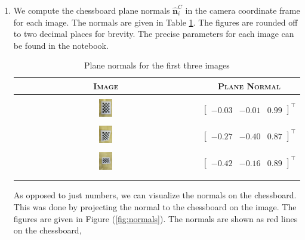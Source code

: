\documentclass[10pt]{article}
\newcommand{\figref}[1]{Figure (\ref{fig:#1})}
\begin{document}
\begin{enumerate}
        \item We compute the chessboard plane normals $\mathbf{\hat{n}}_{i}^{C}$ in the
        camera coordinate frame for each image. The normals are given in Table
        \ref{tab:plane-normals}. The figures are rounded off to two decimal places for
        brevity. The precise parameters for each image can be found in the notebook.
        \begin{longtable}{c|c}
            \textsc{Image} & \textsc{Plane Normal} \\
            \hline & \\
            \includegraphics[width=0.075\textwidth, valign=c]{Assets/Camera-Calibration/01.jpg}
            & $\begin{bmatrix} -0.03 & -0.01 & 0.99 \end{bmatrix}^{\top}$ \\
            & \\
            \includegraphics[width=0.075\textwidth, valign=c]{Assets/Camera-Calibration/02.jpg}
            & $\begin{bmatrix} -0.27 & -0.40 & 0.87 \end{bmatrix}^{\top}$ \\
            & \\
            \includegraphics[width=0.075\textwidth, valign=c]{Assets/Camera-Calibration/03.jpg}
            & $\begin{bmatrix} -0.42 & -0.16 & 0.89 \end{bmatrix}^{\top}$ \\
            & \\
            \caption{Plane normals for the first three images}
            \label{tab:plane-normals}
        \end{longtable}
        As opposed to just numbers, we can visualize the normals on the chessboard. This
        was done by projecting the normal to the chessboard on the image. The figures are
        given in \figref{normals}. The normals are shown as red lines on the chessboard,

\end{enumerate}
\end{document}

